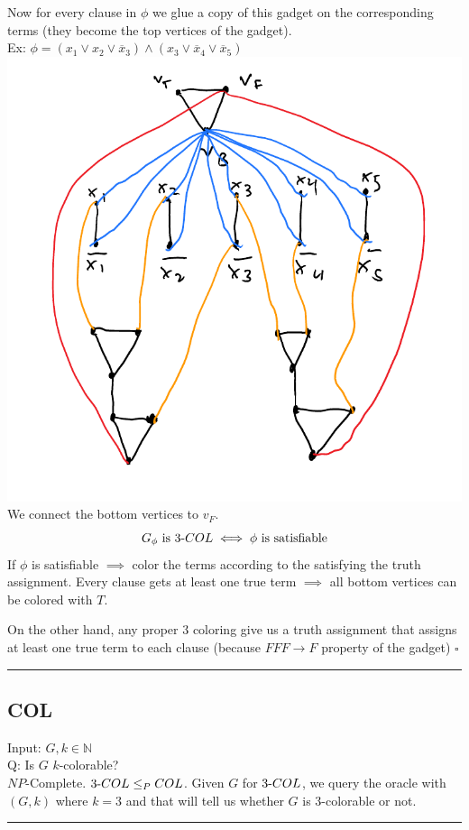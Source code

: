 \documentclass[12 pt]{article}
\begin{document}
          Now for every clause in $\phi$ we glue a copy of this gadget
          on the corresponding terms (they become the top vertices of
          the gadget).
          \\ Ex: $\phi = (x_1 \lor x_2 \lor \overline{x}_3) \land (x_3
          \lor \overline{x}_4 \lor \overline{x}_5)$
          \\ \includegraphics[width=.9\textwidth]{i139.pdf}
          \\ We connect the bottom vertices to $v_F$. $$G_\phi \text{
            is }3\hbox{-}COL \iff \phi \text{ is satisfiable}$$
          If $\phi$ is satisfiable $\implies$ color the terms
          according to the satisfying the truth assignment.
          Every clause gets at least one true term $\implies$ all
          bottom vertices can be colored with $T$.

          On the other hand, any proper $3$ coloring give us a truth
          assignment that assigns at least one true term to each
          clause (because $FFF \to F$ property of the gadget) \hfill
          $\square$
          \\ \noindent \rule{\textwidth}{0.5pt}
          \subsection{COL}
          Input: $G, k \in \mathbb{N}$
          \\ Q: Is $G$ $k$-colorable?
          \\ $NP$-Complete. $3\hbox{-}COL\leq_P COL$. Given $G$ for
          $3\hbox{-}COL$, we query the oracle with $(G,k)$ where $k=3$
          and that will tell us whether $G$ is $3$-colorable or not.
          \\ \noindent \rule{\textwidth}{0.5pt}
\end{document}
